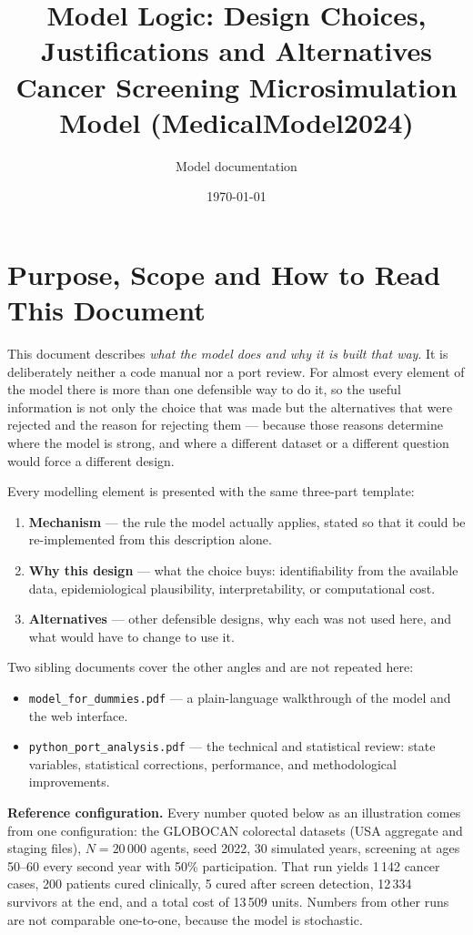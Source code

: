 \documentclass[12pt,a4paper]{article}
\title{Model Logic: Design Choices, Justifications and Alternatives\\[0.4em]
\large Cancer Screening Microsimulation Model (MedicalModel2024)}
\author{Model documentation}
\date{\today}
\newcommand{\id}[1]{\texttt{#1}}
\begin{document}
\maketitle
\tableofcontents
\newpage

\section{Purpose, Scope and How to Read This Document}

This document describes \emph{what the model does and why it is built that way}. It is deliberately
neither a code manual nor a port review. For almost every element of the model there is more than one
defensible way to do it, so the useful information is not only the choice that was made but the
alternatives that were rejected and the reason for rejecting them --- because those reasons determine
where the model is strong, and where a different dataset or a different question would force a
different design.

Every modelling element is presented with the same three-part template:

\begin{enumerate}[nosep]
  \item \textbf{Mechanism} --- the rule the model actually applies, stated so that it could be
        re-implemented from this description alone.
  \item \textbf{Why this design} --- what the choice buys: identifiability from the available data,
        epidemiological plausibility, interpretability, or computational cost.
  \item \textbf{Alternatives} --- other defensible designs, why each was not used here, and what would
        have to change to use it.
\end{enumerate}

Two sibling documents cover the other angles and are not repeated here:

\begin{itemize}[nosep]
  \item \id{model\_for\_dummies.pdf} --- a plain-language walkthrough of the model and the web interface.
  \item \id{python\_port\_analysis.pdf} --- the technical and statistical review: state variables,
        statistical corrections, performance, and methodological improvements.
\end{itemize}

\textbf{Reference configuration.} Every number quoted below as an illustration comes from one
configuration: the GLOBOCAN colorectal datasets (USA aggregate and staging files), $N = 20\,000$ agents,
seed 2022, 30 simulated years, screening at ages 50--60 every second year with 50\% participation. That
run yields 1\,142 cancer cases, 200 patients cured clinically, 5 cured after screen detection, 12\,334
survivors at the end, and a total cost of 13\,509 units. Numbers from other runs are not comparable
one-to-one, because the model is stochastic.
\end{document}
